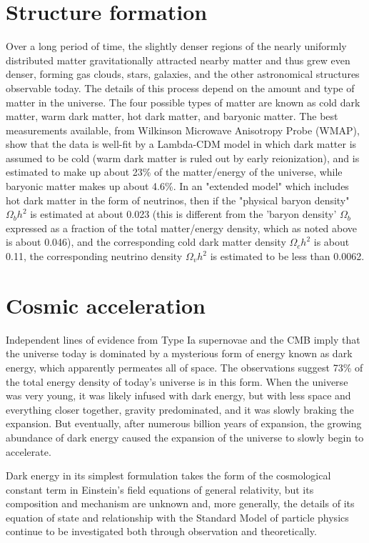 \documentclass[14pt, oneside]{book}
\begin{document}
		\section{Structure formation}
			Over a long period of time, the slightly denser regions of the nearly uniformly distributed matter gravitationally attracted nearby matter and thus grew even denser, forming gas clouds, stars, galaxies, and the other astronomical structures observable today. The details of this process depend on the amount and type of matter in the universe. The four possible types of matter are known as cold dark matter, warm dark matter, hot dark matter, and baryonic matter. The best measurements available, from Wilkinson Microwave Anisotropy Probe (WMAP), show that the data is well-fit by a Lambda-CDM model in which dark matter is assumed to be cold (warm dark matter is ruled out by early reionization), and is estimated to make up about 23\% of the matter/energy of the universe, while baryonic matter makes up about 4.6\%. In an "extended model" which includes hot dark matter in the form of neutrinos, then if the "physical baryon density" $\Omega_{b}h^{2}$ is estimated at about 0.023 (this is different from the 'baryon density' $\Omega_{b}$ expressed as a fraction of the total matter/energy density, which as noted above is about 0.046), and the corresponding cold dark matter density $\Omega_{c}h^{2}$ is about 0.11, the corresponding neutrino density $\Omega_{v}h^{2}$ is estimated to be less than 0.0062. 
	
		\section{Cosmic acceleration}
			Independent lines of evidence from Type Ia supernovae and the CMB imply that the universe today is dominated by a mysterious form of energy known as dark energy, which apparently permeates all of space. The observations suggest 73\% of the total energy density of today's universe is in this form. When the universe was very young, it was likely infused with dark energy, but with less space and everything closer together, gravity predominated, and it was slowly braking the expansion. But eventually, after numerous billion years of expansion, the growing abundance of dark energy caused the expansion of the universe to slowly begin to accelerate.
	
			Dark energy in its simplest formulation takes the form of the cosmological constant term in Einstein's field equations of general relativity, but its composition and mechanism are unknown and, more generally, the details of its equation of state and relationship with the Standard Model of particle physics continue to be investigated both through observation and theoretically.
	
\end{document}
